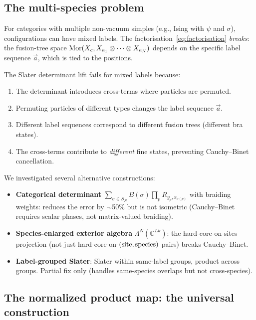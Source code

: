 \subsection{The multi-species problem}

For categories with multiple non-vacuum simples (e.g., Ising with $\psi$ and $\sigma$), configurations can have mixed labels. The factorisation~\eqref{eq:factorisation} \emph{breaks}: the fusion-tree space $\operatorname{Mor}(X_c, X_{a_1} \otimes \cdots \otimes X_{a_N})$ depends on the specific label sequence $\vec{a}$, which is tied to the positions.

The Slater determinant lift fails for mixed labels because:
\begin{enumerate}
    \item The determinant introduces cross-terms where particles are permuted.
    \item Permuting particles of different types changes the label sequence $\vec{a}$.
    \item Different label sequences correspond to different fusion trees (different bra states).
    \item The cross-terms contribute to \emph{different} fine states, preventing Cauchy--Binet cancellation.
\end{enumerate}

We investigated several alternative constructions:
\begin{itemize}
    \item \textbf{Categorical determinant} $\sum_{\sigma \in S_N} B(\sigma) \prod_p R_{y_p, x_{\sigma(p)}}$ with braiding weights: reduces the error by $\sim$50\% but is not isometric (Cauchy--Binet requires scalar phases, not matrix-valued braiding).
    \item \textbf{Species-enlarged exterior algebra} $\Lambda^N(\mathbb{C}^{Lk})$: the hard-core-on-sites projection (not just hard-core-on-$({\rm site},{\rm species})$ pairs) breaks Cauchy--Binet.
    \item \textbf{Label-grouped Slater}: Slater within same-label groups, product across groups. Partial fix only (handles same-species overlaps but not cross-species).
\end{itemize}

\subsection{The normalized product map: the universal construction}
\label{sec:normalized-product}

